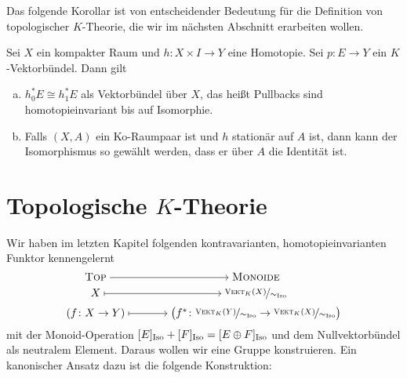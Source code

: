 Das folgende Korollar ist von entscheidender Bedeutung für die Definition von topologischer $K$-Theorie, die wir im nächsten Abschnitt erarbeiten wollen.

\begin{korollarB}[{name=[Homotopieinvarianz von Pullbacks]}]
Sei $X$ ein kompakter Raum und $h \colon X \times I \to Y$ eine Homotopie. Sei $p \colon E \to Y$ ein $K$-Vektorbündel. Dann gilt
\begin{enumerate}[a)]
	\item $h_0^* E \cong h_1^* E$ als Vektorbündel über $X$, das heißt Pullbacks sind homotopieinvariant bis auf Isomorphie.
	\item Falls $(X,A)$ ein Ko-Raumpaar ist und $h$ stationär auf $A$ ist, dann kann der Isomorphismus so gewählt werden, dass er über $A$ die Identität ist.\qedhere
\end{enumerate}	
\end{korollarB}

\newpage

\section{Topologische $K$-Theorie} %
\label{sec:3}
Wir haben im letzten Kapitel folgenden kontravarianten, homotopieinvarianten Funktor kennengelernt
\[
	\begin{tikzcd}[row sep=0.1em, column sep=large,cramped]
		\TOP \rar & \MONOIDE \\
		X \rar[mapsto] & \nicefrac{\VEKT_K(X)}{\sim_{\mathrm{Iso}}} \\
		(f \colon X \to Y) \rar[mapsto] & \enbrace[\big]{f^* \colon \nicefrac{\VEKT_K(Y)}{\sim_{\mathrm{Iso}}} \to \nicefrac{\VEKT_K(X)}{\sim_{\mathrm{Iso}}}} 
	\end{tikzcd}
\]
mit der Monoid-Operation $[E]_{\operatorname{Iso}} + [F]_{\operatorname{Iso}} = [E \oplus F]_{\operatorname{Iso}}$ und dem Nullvektorbündel als neutralem Element. Daraus wollen wir eine Gruppe konstruieren. Ein kanonischer Ansatz dazu ist die folgende Konstruktion: 

